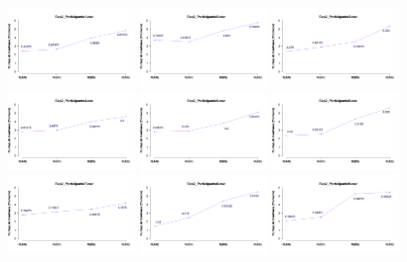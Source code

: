 \begin{figure}[th]
\centering
\includegraphics[width=0.30\textwidth]{Figures/MirrorRating_Exp2_P1} \includegraphics[width=0.30\textwidth]{Figures/MirrorRating_Exp2_P2} \includegraphics[width=0.30\textwidth]{Figures/MirrorRating_Exp2_P3}
\includegraphics[width=0.30\textwidth]{Figures/MirrorRating_Exp2_P4} \includegraphics[width=0.30\textwidth]{Figures/MirrorRating_Exp2_P5} \includegraphics[width=0.30\textwidth]{Figures/MirrorRating_Exp2_P6}
\includegraphics[width=0.30\textwidth]{Figures/MirrorRating_Exp2_P7} \includegraphics[width=0.30\textwidth]{Figures/MirrorRating_Exp2_P8} \includegraphics[width=0.30\textwidth]{Figures/MirrorRating_Exp2_P9}

\end{figure}
